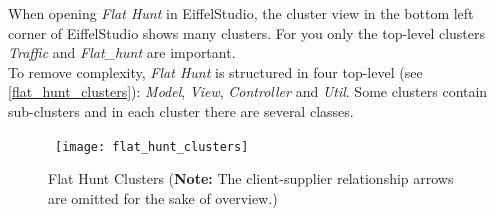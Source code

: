 When opening \emph{Flat Hunt} in EiffelStudio, the cluster view in the bottom left corner of EiffelStudio shows many clusters. For you only the top-level clusters \emph{Traffic} and \emph{Flat\_hunt} are important.\\

To remove complexity, \emph{Flat Hunt} is structured in four top-level (see \autoref{flat_hunt_clusters}): \emph{Model}, \emph{View}, \emph{Controller} and \emph{Util}. Some clusters contain sub-clusters and in each cluster there are several classes.

\begin{figure}[h]
\centerline{\hbox{  
  \texttt{[image: flat\_hunt\_clusters]}
  }}
  \caption{Flat Hunt Clusters (\textbf{Note:} The client-supplier relationship arrows are omitted for the sake of overview.)}
\label{flat_hunt_clusters}
\end{figure}

